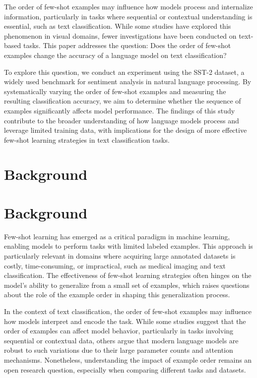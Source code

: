 \documentclass{article}
\begin{document}
The order of few-shot examples may influence how models process and internalize information, particularly in tasks where sequential or contextual understanding is essential, such as text classification. While some studies have explored this phenomenon in visual domains, fewer investigations have been conducted on text-based tasks. This paper addresses the question: Does the order of few-shot examples change the accuracy of a language model on text classification?

To explore this question, we conduct an experiment using the SST-2 dataset, a widely used benchmark for sentiment analysis in natural language processing. By systematically varying the order of few-shot examples and measuring the resulting classification accuracy, we aim to determine whether the sequence of examples significantly affects model performance. The findings of this study contribute to the broader understanding of how language models process and leverage limited training data, with implications for the design of more effective few-shot learning strategies in text classification tasks.
\section{Background}
\section*{Background}

Few-shot learning has emerged as a critical paradigm in machine learning, enabling models to perform tasks with limited labeled examples. This approach is particularly relevant in domains where acquiring large annotated datasets is costly, time-consuming, or impractical, such as medical imaging and text classification. The effectiveness of few-shot learning strategies often hinges on the model's ability to generalize from a small set of examples, which raises questions about the role of the example order in shaping this generalization process.

In the context of text classification, the order of few-shot examples may influence how models interpret and encode the task. While some studies suggest that the order of examples can affect model behavior, particularly in tasks involving sequential or contextual data, others argue that modern language models are robust to such variations due to their large parameter counts and attention mechanisms. Nonetheless, understanding the impact of example order remains an open research question, especially when comparing different tasks and datasets.
\end{document}
